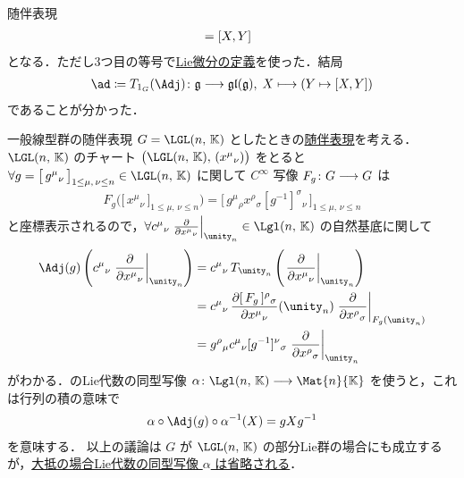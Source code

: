 \documentclass[geometry_main]{subfiles}
\begin{document}
\begin{myexample}[label=def:Lie-adj]{随伴表現}
\begin{align}
        &= \comm{X}{Y}
    \end{align}
    となる．ただし3つ目の等号で\hyperref[def:Liedv]{Lie微分の定義}を使った．結局
    \begin{align}
        \ad \coloneqq T_{1_G} (\Adj) \colon \mathfrak{g} \lto \mathfrak{gl}(\mathfrak{g}),\; X \lmto (Y \mapsto \comm{X}{Y})
    \end{align}
    であることが分かった．
    
\end{myexample}

\begin{myexample}[label=ex:gl-adj]{一般線型群の随伴表現}
    $G = \LGL (n,\, \mathbb{K})$ としたときの\hyperref[def:Lie-adj]{随伴表現}を考える．$\LGL(n,\, \mathbb{K})$ のチャート $\bigl( \LGL(n,\, \mathbb{K}),\, (x^\mu{}_\nu) \bigr)$ をとると $\forall g = \bigl[\, g^\mu{}_\nu \,\bigr]_{1 \le \mu,\, \nu \le n} \in \LGL(n,\, \mathbb{K})$ に関して $C^\infty$ 写像 $F_g \colon G \longrightarrow G$ は
    \begin{align}
        F_g \bigl( \bigl[\, x^\mu{}_\nu \,\bigr]_{1 \le \mu,\, \nu \le n}  \bigr) = \bigl[ \, g^\mu{}_\rho x^\rho{}_\sigma [g^{-1}]^\sigma{}_\nu \, \bigr]_{1 \le \mu,\, \nu \le n}
    \end{align}
    と座標表示されるので，$\forall c^\mu{}_\nu \eval{\pdv{}{x^\mu{}_\nu}}_{\unity_n} \in \Lgl (n,\, \mathbb{K})$ の自然基底に関して
    \begin{align}
        \Adj (g) \left( c^\mu{}_\nu \eval{\pdv{}{x^\mu{}_\nu}}_{\unity_n} \right) 
        &= c^\mu{}_\nu\, T_{\unity_n} \left( \eval{\pdv{}{x^\mu{}_\nu}}_{\unity_n} \right) \\
        &= c^\mu{}_\nu\, \pdv{[\, F_g \,]^\rho{}_\sigma}{x^\mu{}_\nu}()(\unity_n) \eval{\pdv{}{x^\rho{}_\sigma}}_{F_g(\unity_n)} \\
        &= g^\rho{}_\mu c^\mu{}_\nu [g^{-1}]^\nu{}_\sigma \eval{\pdv{}{x^\rho{}_\sigma}}_{\unity_n}
    \end{align}
    がわかる．のLie代数の同型写像 $\alpha \colon \Lgl(n,\, \mathbb{K}) \lto \Mat{n}{\mathbb{K}}$ を使うと，これは行列の積の意味で
    \begin{align}
        \alpha \circ \Adj (g)  \circ \alpha^{-1} (X) = g X g^{-1}
    \end{align}
    を意味する．
    以上の議論は $G$ が $\LGL(n,\, \mathbb{K})$ の部分Lie群の場合にも成立するが，\underline{大抵の場合Lie代数の同型写像 $\alpha$ は省略される}．
\end{myexample}
\end{document}
